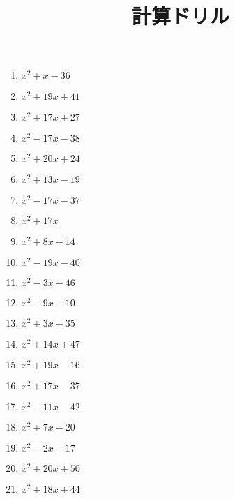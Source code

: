 \documentclass[9pt,dvipdfmx,a4paper]{article}
\begin{document}
    
\title{計算ドリル} 
\date{} 
\maketitle
\begin{multicols}{2}
 \begin{enumerate}

\item
$ x^{2} + x - 36$

\item
$ x^{2} + 19 x + 41$

\item
$ x^{2} + 17 x + 27$

\item
$ x^{2} - 17 x - 38$

\item
$ x^{2} + 20 x + 24$

\item
$ x^{2} + 13 x - 19$

\item
$ x^{2} - 17 x - 37$

\item
$ x^{2} + 17 x$

\item
$ x^{2} + 8 x - 14$

\item
$ x^{2} - 19 x - 40$

\item
$ x^{2} - 3 x - 46$

\item
$ x^{2} - 9 x - 10$

\item
$ x^{2} + 3 x - 35$

\item
$ x^{2} + 14 x + 47$

\item
$ x^{2} + 19 x - 16$

\item
$ x^{2} + 17 x - 37$

\item
$ x^{2} - 11 x - 42$

\item
$ x^{2} + 7 x - 20$

\item
$ x^{2} - 2 x - 17$

\item
$ x^{2} + 20 x + 50$

\item
$ x^{2} + 18 x + 44$


\end{enumerate}
\end{multicols}
\end{document}
